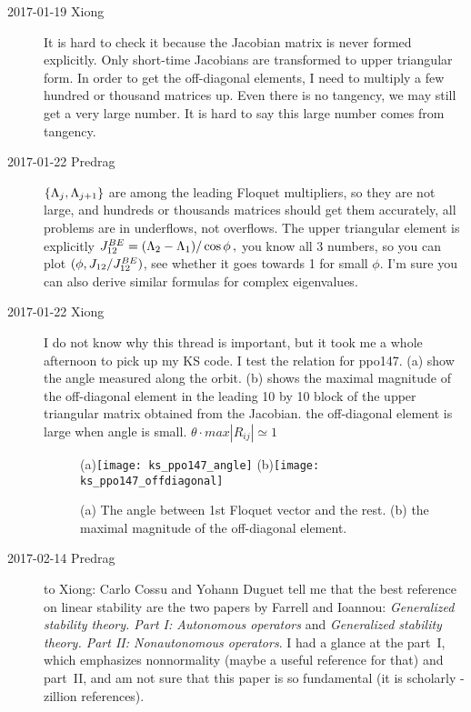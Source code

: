 \begin{description}
\item[2017-01-19 Xiong]
It is hard to check it because the Jacobian matrix is never formed
explicitly. Only short-time Jacobians are transformed to upper triangular
form. In order to get the off-diagonal elements, I need to multiply
a few hundred or thousand matrices up. Even there is no tangency, we
may still get a very large number. It is hard to say this large number
comes from tangency.

\item[2017-01-22 Predrag]
$\{\Lambda_j,\Lambda_{j+1}\}$ are among the leading Floquet
multipliers, so they are not large, and hundreds or thousands matrices
should get them accurately, all problems are in underflows, not
overflows. The upper triangular element is explicitly
\(
J_{12}^{BE} = (\Lambda_2-\Lambda_1)/\cos \phi
\,,
\)
you know all 3 numbers, so you can plot
$(\phi,J_{12}/J_{12}^{BE})$, see whether it goes towards 1 for
small $\phi$. I'm sure you can also derive similar formulas for complex
eigenvalues.

\item[2017-01-22 Xiong]
I do not know why this thread is important, but it took me a whole
afternoon to pick up my KS code. I test the relation for ppo147.
(a) show the angle measured along
the orbit. (b) shows the maximal magnitude of the
off-diagonal element in the leading 10 by 10 block of the upper
triangular matrix obtained from the Jacobian. the off-diagonal
element is large when angle is small.
$\theta \cdot max|R_{ij}| \simeq 1$
\begin{figure}[h]
  \centering
  (a)\texttt{[image: ks\_ppo147\_angle]}
  (b)\texttt{[image: ks\_ppo147\_offdiagonal]}
  \caption{
    (a) The angle between 1st Floquet vector and the rest. (b)
    the maximal magnitude of the
    off-diagonal element.
  }
  \label{fig:ks_ppo147_offdiagonal}
\end{figure}

\item[2017-02-14 Predrag] to Xiong: Carlo Cossu and Yohann Duguet
tell me that the best reference on linear stability are the two papers
by  Farrell and Ioannou:
{\em Generalized stability theory.
    {Part I: Autonomous} operators}
and
{\em Generalized stability theory. {
     Part II: Nonautonomous} operators}.
I had a glance at the part~I, which emphasizes nonnormality (maybe a
useful reference for that) and part~II, and am not sure that this paper
is so fundamental (it is scholarly - zillion references).


\end{description}
